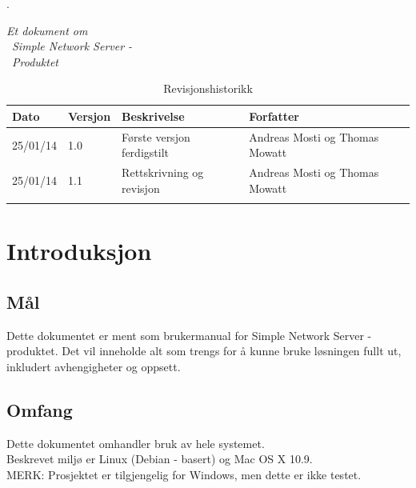 \documentclass{article}
\begin{document}




\newpage
.\vfill
\begin{centering}
\LARGE


\textit{Et dokument om}  \\ 
\ \textit {Simple Network Server -} \\ 
\ \textit {Produktet}
\vspace{12cm}
\hspace{15cm}
\newpage
\end{centering} 
\pagestyle{fancy}
\setlength\headsep{30pt}


\begin{table}[h] %

\caption{Revisjonshistorikk}
	\begin{tabular}{| m{3cm} | m{1cm} | m{5cm} | m{4cm} |} 
	\hline	
	Dato & Versjon & Beskrivelse & Forfatter\\ 
	\hline
	 25/01/14 & 1.0 & Første versjon ferdigstilt & Andreas Mosti og Thomas Mowatt\\ 
	\hline
	25/01/14 & 1.1  & Rettskrivning og revisjon  & Andreas Mosti og Thomas Mowatt \\ 
	\hline
	 &  &  & \\ 
	\hline
	
	\end{tabular}
\end{table}

\newpage

\tableofcontents
\newpage
\section{Introduksjon}
\subsection{Mål}
Dette dokumentet er ment som brukermanual for Simple Network Server - produktet. Det vil inneholde alt som trengs for å kunne bruke løsningen fullt ut, inkludert avhengigheter og oppsett.
\subsection{Omfang}
Dette dokumentet omhandler bruk av hele systemet. \\ Beskrevet miljø er Linux (Debian - basert) og Mac OS X 10.9.
\\ MERK: Prosjektet er tilgjengelig for Windows, men dette er ikke testet. 
\end{document}
